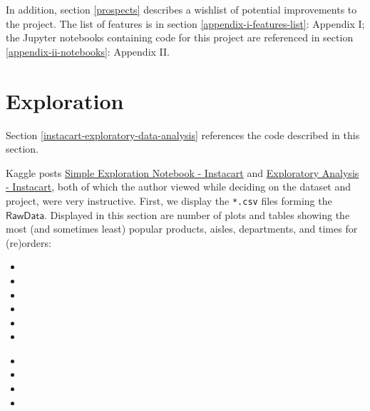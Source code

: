 \documentclass[11pt]{article}
\theoremstyle{definition}
\numberwithin{equation}{section}
\begin{document}
In addition, section \ref{prospects} describes a wishlist of potential improvements to the project.
The list of features is in section \ref{appendix-i-features-list}: Appendix I; the Jupyter notebooks
containing code for this project are referenced in section \ref{appendix-ii-notebooks}: Appendix II.




\hypertarget{exploration}{%
  \section{Exploration}\label{exploration}}

Section \ref{instacart-exploratory-data-analysis} references the code described in this section.

Kaggle posts
\href{https://www.kaggle.com/sudalairajkumar/simple-exploration-notebook-instacart}{Simple
Exploration Notebook - Instacart} and
\href{https://www.kaggle.com/philippsp/exploratory-analysis-instacart}{Exploratory
Analysis - Instacart}, both of which the author viewed while deciding on the dataset and project, were very instructive. First, we display the \texttt{*.csv} files forming the $\mathsf{RawData}$. Displayed in this section are number of plots and tables showing the most (and sometimes least) popular products, aisles, departments, and times for (re)orders:

\bigskip
\begin{minipage}[t]{0.48\textwidth}
\begin{itemize}
\item {}
\item {}
\item {}
\item {}
\item {}
\item {}
\end{itemize}
\end{minipage}\hfill
\begin{minipage}[t]{0.48\textwidth}
\begin{itemize}
\item {}
\item {}
\item {}
\item {}
\end{itemize}
\end{minipage}
\end{document}

